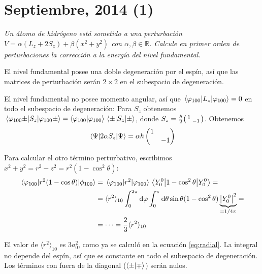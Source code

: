 \chapter{Septiembre, 2014 (1)}
\begin{tcolorbox}[halign=left]
  \emph{Un átomo de hidrógeno está sometido a una perturbación
    $V=\alpha(L_z+2S_z) + \beta(x^2+y^2)$ con $\alpha,\beta\in
    \mathbb{R}$. Calcule en primer orden de perturbaciones la
    corrección a la energía del nivel fundamental.}
\end{tcolorbox}

El nivel fundamental posee una doble degeneración por el espín, así
que las matrices de perturbación serán $2\times2$ en el subespacio de degeneración.

El nivel fundamental no posee momento angular, así que 
$\mel{\varphi_{100}}{L_z}{\varphi_{100}}=0$ en todo el subespacio de
degeneración:
Para $S_z$ obtenemos
$\mel{\varphi_{100}\pm}{S_z}{\varphi_{100}\pm}=\ip{\varphi_{100}}\mel{\pm}{S_z}{\pm}$, donde $S_z =
\frac{\hbar}{2} \smqty(1& \\ & -1)$. Obtenemos
\begin{equation}
  \mel{\Psi}{2\alpha S_z}{\Psi} = \alpha \hbar
  \begin{pmatrix}
    1 & \\ & -1 \\
  \end{pmatrix}
\end{equation}

Para calcular el otro término perturbativo, escribimos $x^2+y^2 =
r^2-z^2 = r^2(1-\cos^2\theta)$:
\begin{equation}
  \begin{split}
    \mel{\varphi_{100}}{r^2(1-\cos\theta)}{\phi_{100}} &=
    \ev{r^2}{\varphi_{100}}\ev{1-\cos^2\theta}{Y_0^0} = \\
    &= \langle r^2\rangle_{10} \int_0^{2\pi} \dd{\varphi}\int_0^\pi
    \dd{\theta}\sin\theta (1-\cos^2\theta)
    \underbrace{\abs{Y_0^0}^2}_{=1/4\pi} = \\ &= \cdots =\frac{2}{3} \langle
    r^2\rangle_{10}
  \end{split}
\end{equation}

El valor de $\langle r^2 \rangle_{10}$ es $3a_0^2$, como ya se calculó
en la ecuación \eqref{eq:radial}. La integral no depende del espín,
así que es constante en todo el subespacio de degeneración. Los
términos con fuera de la diagonal ($\braket{\pm}{\mp}$) serán nulos.

